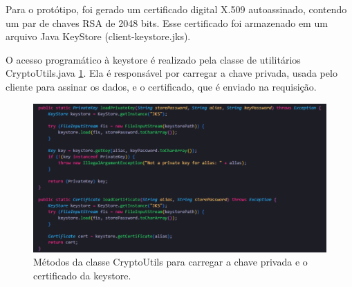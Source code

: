 \documentclass[12pt]{article}
\begin{document}
Para o protótipo, foi gerado um certificado digital X.509 autoassinado, contendo um par de chaves RSA de 2048 bits. Esse certificado foi armazenado em um arquivo Java KeyStore (client-keystore.jks).

O acesso programático à keystore é realizado pela classe de utilitários CryptoUtils.java \ref{fig:CryptoUtils}. Ela é responsável por carregar a chave privada, usada pelo cliente para assinar os dados, e o certificado, que é enviado na requisição.

\begin{figure}[h]
    \centering
    \includegraphics[width=0.8\linewidth]{Imagens/CryptoUtils.png}  
    \caption{Métodos da classe CryptoUtils para carregar a chave privada e o certificado da keystore.}
    \label{fig:CryptoUtils}
\end{figure}
\end{document}
